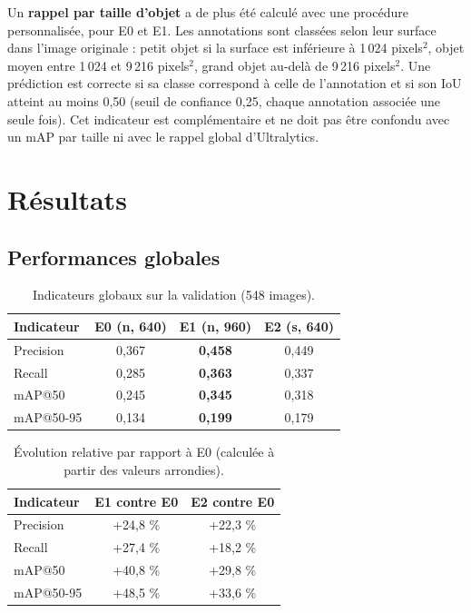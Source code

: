 \documentclass[11pt,a4paper]{article}
\begin{document}
Un \textbf{rappel par taille d'objet} a de plus été calculé avec une
procédure personnalisée, pour E0 et E1. Les annotations sont classées selon
leur surface dans l'image originale : petit objet si la surface est
inférieure à 1\,024 pixels$^2$, objet moyen entre 1\,024 et 9\,216
pixels$^2$, grand objet au-delà de 9\,216 pixels$^2$. Une prédiction est
correcte si sa classe correspond à celle de l'annotation et si son IoU
atteint au moins 0,50 (seuil de confiance 0,25, chaque annotation associée
une seule fois). Cet indicateur est complémentaire et ne doit pas être
confondu avec un mAP par taille ni avec le rappel global d'Ultralytics.

\section{Résultats}
\label{sec:resultats}

\subsection{Performances globales}
\begin{table}[htbp]
\centering
\small
\begin{tabular}{@{}lccc@{}}
\toprule
Indicateur & E0 (n, 640) & E1 (n, 960) & E2 (s, 640) \\
\midrule
Precision & 0,367 & \textbf{0,458} & 0,449 \\
Recall & 0,285 & \textbf{0,363} & 0,337 \\
mAP@50 & 0,245 & \textbf{0,345} & 0,318 \\
mAP@50-95 & 0,134 & \textbf{0,199} & 0,179 \\
\bottomrule
\end{tabular}
\caption{Indicateurs globaux sur la validation (548 images).}
\label{tab:globaux}
\end{table}

\begin{table}[htbp]
\centering
\small
\begin{tabular}{@{}lcc@{}}
\toprule
Indicateur & E1 contre E0 & E2 contre E0 \\
\midrule
Precision & +24,8 \% & +22,3 \% \\
Recall & +27,4 \% & +18,2 \% \\
mAP@50 & +40,8 \% & +29,8 \% \\
mAP@50-95 & +48,5 \% & +33,6 \% \\
\bottomrule
\end{tabular}
\caption{Évolution relative par rapport à E0 (calculée à partir des valeurs arrondies).}
\label{tab:relatif}
\end{table}
\end{document}
